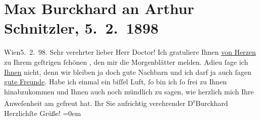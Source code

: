 

         
         \renewcommand{\erwaehntePersonen}{Personen: Max Eugen Burckhard}
         \renewcommand{\erwaehnteOrte}{Orte: Burgtheater, Carl-Theater, Wien}
         \renewcommand{\erwaehnteWerke}{Werke: Freiwild. Schauspiel in 3 Akten}
               \section[Max Burckhard an Arthur Schnitzler, 5. 2. 1898]{ Max Burckhard an Arthur Schnitzler, 5. 2. 1898}\nopagebreak{}\rehead{ }\begin{ledgroupsized}[t]{13cm}\normalsize\beginnumbering \toendnotes[C]{\smallbreak\pagebreak[2]} 
\toendnotes[C]{\smallbreak}\pstart
           \raggedleft{}{\pb}Wien5. 2. 98.\pend
           \pstart{}Sehr verehrter lieber Herr Doctor!\pend\pstart
           Ich gratuliere Ihnen \uline{von Herzen} zu Ihrem geſtrigen
               ſchönen \label{K_L00773-1v}\label{K_L00773-1h}, den mir die
               Morgenblätter melden. Adieu ſage ich \uline{Ihnen} nicht,
               denn wir bleiben ja doch gute Nachbarn und ich darf ja auch ſagen \uline{gute Freunde}. Habe ich einmal ein biſſel Luft, ſo bin
               ich ſo frei zu Ihnen hinabzukommen und Ihnen auch noch mündlich zu sagen, wie
               herzlich mich Ihre Anweſenheit am \label{K_L00773-2v}\label{K_L00773-2h} gefreut hat. Ihr Sie aufrichtig verehrender\pend
           \pstart
           \spacefill\mbox{D\textsuperscript{r}Burckhard}{\\[\baselineskip]}Herzlichſte Grüße!\pend
           \leftskip=0em{}
         
         \endnumbering{}\end{ledgroupsized}  \newcommand{\dateiname}{L00773}\newcommand{\titel}{Max Burckhard an Arthur Schnitzler, 5. 2. 1898}\newcommand{\editorInnen}{Martin Anton Müller und Gerd-Hermann Susen}
      